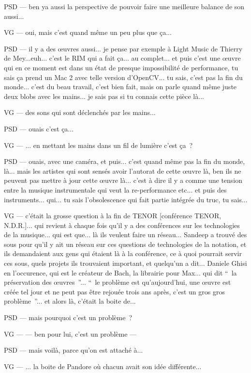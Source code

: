 PSD — ben ya aussi la perspective de pouvoir faire une meilleure balance de son aussi...

VG — oui, mais c'est quand même un peu plus que ça...

PSD — il y a des œuvres aussi... je pense par exemple à Light Music de Thierry de Mey...euh... c'est le RIM qui a fait ça... au complet... et puis c'est une œuvre qui en ce moment est dans un état de presque impossibilité de performance, tu sais ça prend un Mac 2 avec telle version d'OpenCV... tu sais, c'est pas la fin du monde... c'est du beau travail, c'est bien fait, mais on parle quand même juste deux blobs avec les mains... je sais pas si tu connais cette pièce là...

VG — des sons qui sont déclenchés par les mains...

PSD — ouais c'est ça...

VG — ... en mettant les mains dans un fil de lumière c'est ça ?

PSD — ouais, avec une caméra, et puis... c'est quand même pas la fin du monde, là... mais les artistes qui sont sensés avoir l'autorat de cette œuvre là, ben ils ne peuvent pas mettre à jour cette œuvre là... c'est à dire il y a comme une tension entre la musique instrumentale qui veut la re-performance etc... et puis des instruments... qui... tu sais l'obsolescence qui fait partie intégrée du truc, tu sais...

VG — c'était la grosse question à la fin de TENOR [conférence TENOR, N.D.R.]... qui revient à chaque fois qu'il y a des conférences sur les technologies de la musique... qui est que... là ils veulent faire un réseau... Sandeep a trouvé des sous pour qu'il y ait un réseau sur ces questions de technologies de la notation, et ils demandaient aux gens qui étaient là à la conférence, ce à quoi pourrait servir ces sous, quels projets ils trouvaient important, et quelqu'un a dit... Daniele Ghisi en l'occurence, qui est le créateur de Bach, la librairie pour Max... qui dit “ la préservation des œuvres ”... “ le problème est qu'aujourd'hui, une œuvre est créée tel jour et ne peut pas être rejouée trois ans après, c'est un gros gros problème ”... et alors là, c'était la boite de...

PSD — mais pourquoi c'est un problème ?

VG — — ben pour lui, c'est un problème —

PSD — mais voilà, parce qu'on est attaché à...

VG — ... la boite de Pandore où chacun avait son idée différente...

